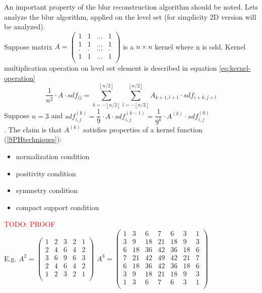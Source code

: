 An important property of the blur reconstruction algorithm should be noted. Lets analyze the blur algorithm, applied on the level set (for simplicity 2D version will be analyzed).\\
Suppose matrix $A = 
\begin{pmatrix}
	1 & 1 & ... & 1\\
	1 & 1 & ... & 1\\
	. & . & ... & .\\
	1 & 1 & ... & 1\\
\end{pmatrix}$ is a $n \times n$ kernel where n is odd.
Kernel multiplication operation on level set element is described in equation \ref{eq:kernel-operation}
\begin{equation}
	\dfrac{1}{n^2}\cdot A\cdot sdf_{ij} = \sum_{k=- \left \lfloor{n/2}\right \rfloor}^{\left \lfloor{n/2}\right \rfloor}
		{\sum_{l=- \left \lfloor{n/2}\right \rfloor}^{\left \lfloor{n/2}\right \rfloor}{ A_{k+1, l+1} \cdot sdf_{i+k, j+l}}}
	\label{eq:kernel-operation}
\end{equation}
Suppose $n=3$ and $ sdf^{(k)}_{i,j} = \dfrac{1}{9} \cdot A \cdot sdf^{(k-1)}_{i,j} = \dfrac{1}{9^k} \cdot A^{(k)} \cdot sdf^{(0)}_{i,j}$\\. The claim is that $A^{(k)}$ satisfies properties of a kernel function (\ref{SPHtechniques}):
\begin{itemize}
	\item normalization condition
	\item positivity condition
	\item symmetry condition
	\item compact support condition
\end{itemize}
\textcolor{red}{TODO: PROOF}\\
E.g. $A^2 = 
\begin{pmatrix}
1 & 2 & 3 & 2 & 1\\
2 & 4 & 6 & 4 & 2\\
3 & 6 & 9 & 6 & 3\\
2 & 4 & 6 & 4 & 2\\
1 & 2 & 3 & 2 & 1\\
\end{pmatrix}$
$A^3 = 
\begin{pmatrix}
 1 & 3 & 6 & 7 & 6 & 3 & 1\\
 3 & 9 & 18 & 21 & 18 & 9 & 3\\
 6 & 18 & 36 & 42 & 36 & 18 & 6\\
 7 & 21 & 42 & 49 & 42 & 21 & 7\\
 6 & 18 & 36 & 42 & 36 & 18 & 6\\
 3 & 9 & 18 & 21 & 18 & 9 & 3\\
 1 & 3 & 6 & 7 & 6 & 3 & 1\\
\end{pmatrix}$\\
